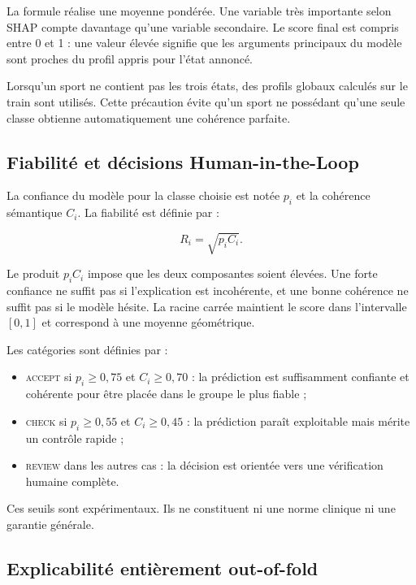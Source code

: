 \documentclass[12pt,a4paper]{article}
\begin{document}
La formule réalise une moyenne pondérée. Une variable très importante selon
SHAP compte davantage qu'une variable secondaire. Le score final est compris
entre 0 et 1 : une valeur élevée signifie que les arguments principaux du
modèle sont proches du profil appris pour l'état annoncé.

Lorsqu'un sport ne contient pas les trois états, des profils globaux calculés
sur le train sont utilisés. Cette précaution évite qu'un sport ne possédant
qu'une seule classe obtienne automatiquement une cohérence parfaite.

\subsection{Fiabilité et décisions Human-in-the-Loop}

La confiance du modèle pour la classe choisie est notée $p_i$ et la cohérence
sémantique $C_i$. La fiabilité est définie par :

\begin{equation}
R_i=\sqrt{p_iC_i}.
\label{eq:reliability}
\end{equation}

Le produit $p_iC_i$ impose que les deux composantes soient élevées. Une forte
confiance ne suffit pas si l'explication est incohérente, et une bonne
cohérence ne suffit pas si le modèle hésite. La racine carrée maintient le
score dans l'intervalle $[0,1]$ et correspond à une moyenne géométrique.

Les catégories sont définies par :

\begin{itemize}[leftmargin=1.5em]
  \item \textsc{accept} si $p_i\geq 0{,}75$ et $C_i\geq 0{,}70$ : la
  prédiction est suffisamment confiante et cohérente pour être placée dans le
  groupe le plus fiable ;
  \item \textsc{check} si $p_i\geq 0{,}55$ et $C_i\geq 0{,}45$ : la
  prédiction paraît exploitable mais mérite un contrôle rapide ;
  \item \textsc{review} dans les autres cas : la décision est orientée vers
  une vérification humaine complète.
\end{itemize}

Ces seuils sont expérimentaux. Ils ne constituent ni une norme clinique ni
une garantie générale.

\subsection{Explicabilité entièrement out-of-fold}
\end{document}
